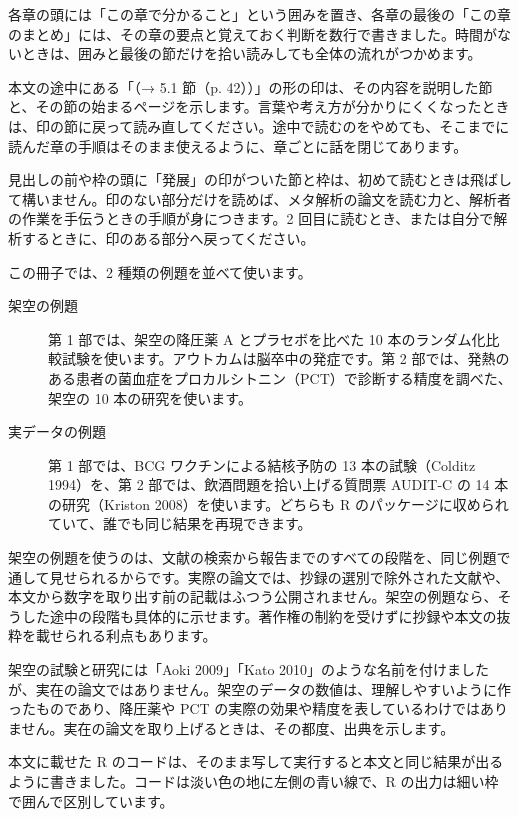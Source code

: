 各章の頭には「この章で分かること」という囲みを置き、各章の最後の「この章のまとめ」には、その章の要点と覚えておく判断を数行で書きました。時間がないときは、囲みと最後の節だけを拾い読みしても全体の流れがつかめます。

本文の途中にある「（→ 5.1 節（p. 42））」の形の印は、その内容を説明した節と、その節の始まるページを示します。言葉や考え方が分かりにくくなったときは、印の節に戻って読み直してください。途中で読むのをやめても、そこまでに読んだ章の手順はそのまま使えるように、章ごとに話を閉じてあります。

見出しの前や枠の頭に「発展」の印がついた節と枠は、初めて読むときは飛ばして構いません。印のない部分だけを読めば、メタ解析の論文を読む力と、解析者の作業を手伝うときの手順が身につきます。2 回目に読むとき、または自分で解析するときに、印のある部分へ戻ってください。


この冊子では、2 種類の例題を並べて使います。

\begin{description}
\item[架空の例題] 第 1 部では、架空の降圧薬 A とプラセボを比べた 10 本のランダム化比較試験を使います。アウトカムは脳卒中の発症です。第 2 部では、発熱のある患者の菌血症をプロカルシトニン（PCT）で診断する精度を調べた、架空の 10 本の研究を使います。
\item[実データの例題] 第 1 部では、BCG ワクチンによる結核予防の 13 本の試験（Colditz 1994）を、第 2 部では、飲酒問題を拾い上げる質問票 AUDIT-C の 14 本の研究（Kriston 2008）を使います。どちらも R のパッケージに収められていて、誰でも同じ結果を再現できます。
\end{description}

架空の例題を使うのは、文献の検索から報告までのすべての段階を、同じ例題で通して見せられるからです。実際の論文では、抄録の選別で除外された文献や、本文から数字を取り出す前の記載はふつう公開されません。架空の例題なら、そうした途中の段階も具体的に示せます。著作権の制約を受けずに抄録や本文の抜粋を載せられる利点もあります。

架空の試験と研究には「Aoki 2009」「Kato 2010」のような名前を付けましたが、実在の論文ではありません。架空のデータの数値は、理解しやすいように作ったものであり、降圧薬や PCT の実際の効果や精度を表しているわけではありません。実在の論文を取り上げるときは、その都度、出典を示します。


本文に載せた R のコードは、そのまま写して実行すると本文と同じ結果が出るように書きました。コードは淡い色の地に左側の青い線で、R の出力は細い枠で囲んで区別しています。

